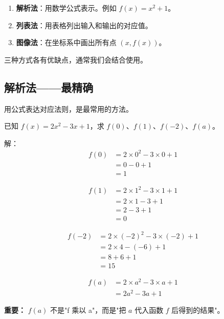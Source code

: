 \begin{definitionbox}[函数的三种表示法]
\begin{enumerate}
  \item \textbf{解析法}：用数学公式表示。例如 \(f(x) = x^2 + 1\)。
  \item \textbf{列表法}：用表格列出输入和输出的对应值。
  \item \textbf{图像法}：在坐标系中画出所有点 \((x, f(x))\)。
\end{enumerate}
三种方式各有优缺点，通常我们会结合使用。
\end{definitionbox}

\subsection{解析法——最精确}

用公式表达对应法则，是最常用的方法。

\begin{examplebox}[5]
已知 \(f(x) = 2x^2 - 3x + 1\)，求 \(f(0)\)、\(f(1)\)、\(f(-2)\)、\(f(a)\)。

解：
\[
\begin{aligned}
f(0) &= 2 \times 0^2 - 3 \times 0 + 1 \\
     &= 0 - 0 + 1 \\
     &= 1
\end{aligned}
\]

\[
\begin{aligned}
f(1) &= 2 \times 1^2 - 3 \times 1 + 1 \\
     &= 2 \times 1 - 3 + 1 \\
     &= 2 - 3 + 1 \\
     &= 0
\end{aligned}
\]

\[
\begin{aligned}
f(-2) &= 2 \times (-2)^2 - 3 \times (-2) + 1 \\
      &= 2 \times 4 - (-6) + 1 \\
      &= 8 + 6 + 1 \\
      &= 15
\end{aligned}
\]

\[
\begin{aligned}
f(a) &= 2 \times a^2 - 3 \times a + 1 \\
     &= 2a^2 - 3a + 1
\end{aligned}
\]

\textbf{重要：} \(f(a)\) 不是"f 乘以 a"，而是"把 \(a\) 代入函数 \(f\) 后得到的结果"。
\end{examplebox}


